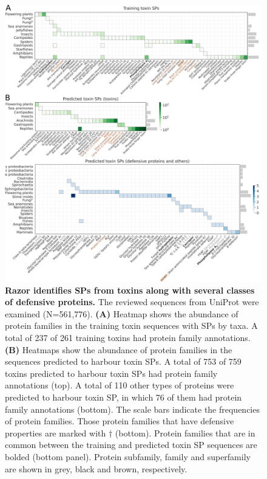 \begin{figure}[!hbtp]
\centerline{\includegraphics[width=1\textwidth]{chapters/Signal_Peptide/Figures/fig4_tox.png}}
\caption[Razor identifies SPs from toxins along with several classes of defensive proteins.]{\textbf{Razor identifies SPs from toxins along with several classes of defensive proteins.} The reviewed sequences from UniProt were examined (N=561,776). \textbf{(A)} Heatmap shows the abundance of protein families in the training toxin sequences with SPs by taxa. A total of 237 of 261 training toxins had protein family annotations. \textbf{(B)} Heatmaps show the abundance of protein families in the sequences predicted to harbour toxin SPs. A total of 753 of 759 toxins predicted to harbour toxin SPs had protein family annotations (top). A total of 110 other types of proteins were predicted to harbour toxin SP, in which 76 of them had protein family annotations (bottom). The scale bars indicate the frequencies of protein families. Those protein families that have defensive properties are marked with $\dagger$ (bottom). Protein families that are in common between the training and predicted toxin SP sequences are bolded (bottom panel). Protein subfamily, family and superfamily are shown in grey, black and brown, respectively.
}\label{fig:razor_04}
\end{figure}

